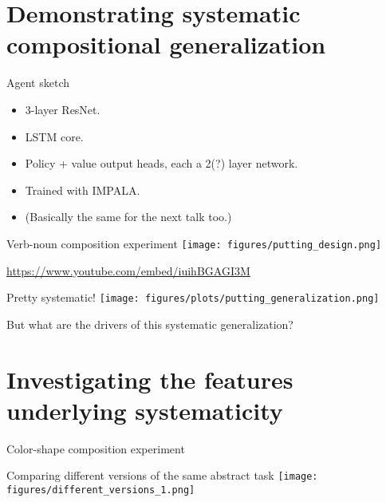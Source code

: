 \documentclass{beamer}
\begin{document}
\section{Demonstrating systematic compositional generalization}

\begin{frame}{Agent sketch}
\begin{itemize}
\item 3-layer ResNet. 
\item LSTM core. 
\item Policy + value output heads, each a 2(?) layer network.
\item Trained with IMPALA.
\item (Basically the same for the next talk too.)
\end{itemize}
\end{frame}

\begin{frame}{Verb-noun composition experiment}
\centering
\texttt{[image: figures/putting\_design.png]}
\end{frame}

\begin{frame}[standout]
\url{https://www.youtube.com/embed/iuihBGAGI3M}
\end{frame}

\begin{frame}{Pretty systematic!}
\centering
\texttt{[image: figures/plots/putting\_generalization.png]}
\end{frame}

\begin{frame}[standout]
But what are the drivers of this systematic generalization?
\end{frame}

\section{Investigating the features underlying systematicity}

\begin{frame}{Color-shape composition experiment}
\centering
{}
\end{frame}

\begin{frame}{Comparing different versions of the same abstract task}
\centering
\texttt{[image: figures/different\_versions\_1.png]}
\end{frame}
\end{document}
